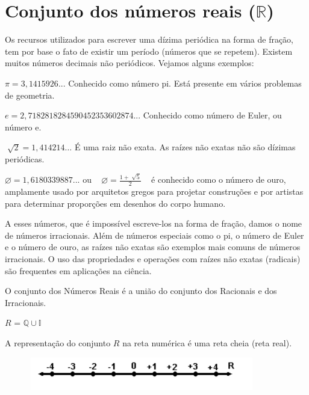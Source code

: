 \section{Conjunto dos números reais ($\mathbb{R}$)}

Os recursos utilizados para escrever uma dízima periódica na forma de fração, tem por base o fato de existir um período (números que se repetem). Existem muitos números decimais não periódicos. Vejamos alguns exemplos:

$ \pi = 3,1415926$... Conhecido como número pi. Está presente em vários problemas de geometria.

$e = 2,7182818284590452353602874$... Conhecido como número de Euler, ou número e.

 \( \sqrt[]{2}=1,414214 \ldots  \)  É uma raiz não exata. As raízes não exatas não são dízimas periódicas.

$\varnothing =1,6180339887$... ou ~  \(  \varnothing =\frac{1+\sqrt[]{5}}{2} \) ~ é conhecido como o número de ouro, amplamente usado por arquitetos gregos para projetar construções e por artistas para determinar proporções em desenhos do corpo humano. 

A esses números, que é impossível escreve-los na forma de fração, damos o nome de números irracionais. Além de números especiais como o pi, o número de Euler e o número de ouro, as raízes não exatas são exemplos mais comuns de números irracionais. O uso das propriedades e operações com raízes não exatas (radicais) são frequentes em aplicações na ciência.
\begin{caixa}
	\begin{tdefinicao}
		
		O conjunto dos Números Reais é a união do conjunto dos Racionais e dos Irracionais.

		\quad  \( R \)  =  \( \mathbb{Q} \cup \mathbb{I}\) \qedsymbol{}
	\end{tdefinicao}
\end{caixa}
A representação do conjunto  \( R \)  na reta numérica é uma reta cheia (reta real).

\begin{figure}[H]
	\begin{Center}
		\includegraphics[width=3.9in,height=0.57in]{capitulos/conjuntos_numericos/media/image9.pdf}
	\end{Center}
\end{figure}

